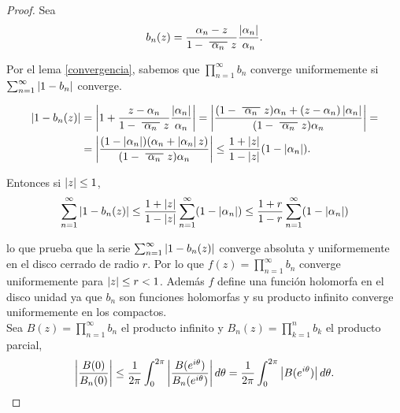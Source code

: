\begin{proof}
    Sea
    \begin{equation*}
        b_n (z) = \frac{\alpha_n - z}{1 - \xbar{\alpha_n}z} \dfrac{\abs{\alpha_n}}{\alpha_n}.
    \end{equation*}

    Por el lema \ref{convergencia}, sabemos que $\prod_{n=1}^{\infty} b_n$ converge uniformemente si $\sum_{n=1}^{\infty} \left\lvert1 - b_n\right\rvert$ converge.

    \begin{equation*}
        \begin{split}
            \abs{1 - b_n(z)} & = \abs{1 + \dfrac{z - \alpha_n}{1 - \xbar{\alpha_n}z} \dfrac{\abs{\alpha_n}}{\alpha_n}} = \abs{\dfrac{(1 - \xbar{\alpha_n}z) \alpha_n + (z - \alpha_n) \abs{\alpha_n}}{(1 - \xbar{\alpha_n}z) \alpha_n}} = \\
                             & = \abs{ \dfrac{(1 - \abs{\alpha_n}) (\alpha_n + \abs{\alpha_n} z)}{(1 - \xbar{\alpha_n}z) \alpha_n}} \leq \dfrac{1 + \abs{z}}{1 - \abs{z}} (1 - \abs{\alpha_n}).
        \end{split}
    \end{equation*}

    Entonces si $\left\lvert z\right\rvert \leq 1$,
    \begin{equation*}
        \sum_{n=1}^{\infty} \abs{1 - b_n(z)} \leq \dfrac{1 + \abs{z}}{1 - \abs{z}} \sum_{n=1}^{\infty} (1 - \abs{\alpha_n}) \leq \dfrac{1 + r}{1 - r} \sum_{n=1}^{\infty} (1 - \abs{\alpha_n})          %
    \end{equation*}

    lo que prueba que la serie $\sum_{n=1}^{\infty} \left\lvert1 - b_n(z)\right\rvert$ converge absoluta y uniformemente en el disco cerrado de radio $r$. Por lo que $f(z) = \prod_{n=1}^{\infty} b_n$ converge uniformemente para $\left\lvert z\right\rvert \leq r < 1$. Además $f$ define una función holomorfa en el disco unidad ya que $b_n$ son funciones holomorfas y su producto infinito converge uniformemente en los compactos. \\


    Sea $B(z) = \prod_{n=1}^{\infty} b_n$ el producto infinito y $B_n(z) = \prod_{k=1}^{n} b_k$ el producto parcial,
    \begin{equation*}
        \left\lvert\frac{B(0)}{B_n(0)}\right\rvert \leq \frac{1}{2 \pi} \int_{0}^{2 \pi} \left\lvert\frac{B(e^{i \theta})}{B_n(e^{i \theta})}\right\rvert d \theta = \frac{1}{2 \pi}  \int_{0}^{2 \pi} \left\lvert B(e^{i \theta})\right\rvert d \theta.
    \end{equation*}


\end{proof}
